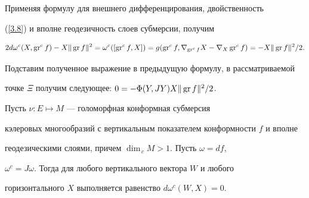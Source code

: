 \begin{pf}
Применяя формулу для внешнего дифференцирования, двойственность


(\ref{3.8}) и вполне геодезичность слоев субмерсии, получим


$$


2d\omega^c(X,\gr^c f)-X\|\GR f \|^2=\omega^c([\gr^c f,X])=


g(\gr^c f,\nabla_{\gr^c f}X-\nabla_X\gr^c f) =


-X\|\GR f \|^2/2.


$$


Подставим полученное выражение в предыдущую формулу, в рассматриваемой


точке $\Xi $ получим следующее: $0=-\Phi (Y,JY)X\|\operatorname{gr} f \|^2/2$.


\end{pf}





\begin{lems}\label{lm3.4}


Пусть $\nu :E\mapsto M$ --- голоморфная конформная субмерсия


кэлеровых многообразий с вертикальным показателем конформности $f$ и вполне


геодезическими слоями, причем $\dim_{\, c}M>1$. Пусть $\omega =df$,


$\omega^c=J\omega$. Тогда для любого вертикального вектора $W$ и любого


горизонтального $X$ выполняется равенство $d\omega^c(W,X)=0$.


\end{lems}





